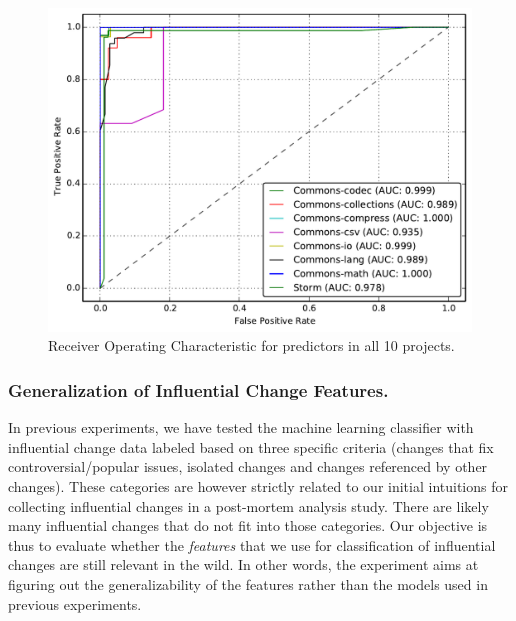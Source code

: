\begin{figure}
\centering
	\includegraphics[width=0.8\linewidth]{fig/roc}
	\caption{Receiver Operating Characteristic for predictors in all 10 projects.}
	\label{fig:auroc}
\end{figure}


\subsubsection{Generalization of Influential Change Features.}
In previous experiments, we have tested the machine learning classifier with
influential change data labeled based on three specific criteria (changes that
fix controversial/popular issues, isolated changes and changes referenced by other changes).
These categories are however strictly related to our initial intuitions for collecting influential
changes in a post-mortem analysis study. There are likely many influential changes that do not
fit into those categories. Our objective is thus to evaluate whether the \textit{features} that we
use for classification of influential changes are still relevant in the wild. In other words, the experiment aims at figuring out the generalizability of the features rather than the models used in previous experiments.



